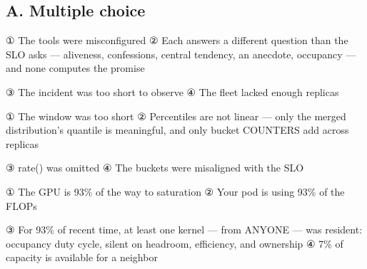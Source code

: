 

\subsection*{A. Multiple choice}


\begin{tbboptions}
  \item ① The tools were misconfigured        ② Each answers a different question than the SLO asks — aliveness, confessions, central tendency, an anecdote, occupancy — and none computes the promise
  \item ③ The incident was too short to observe        ④ The fleet lacked enough replicas
\end{tbboptions}


\begin{tbboptions}
  \item ① The window was too short        ② Percentiles are not linear — only the merged distribution’s quantile is meaningful, and only bucket COUNTERS add across replicas
  \item ③ rate() was omitted        ④ The buckets were misaligned with the SLO
\end{tbboptions}


\begin{tbboptions}
  \item ① The GPU is 93\% of the way to saturation        ② Your pod is using 93\% of the FLOPs
  \item ③ For 93\% of recent time, at least one kernel — from ANYONE — was resident: occupancy duty cycle, silent on headroom, efficiency, and ownership        ④ 7\% of capacity is available for a neighbor
\end{tbboptions}

